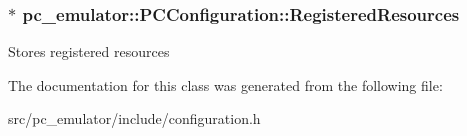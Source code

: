\subsubsection[{\texorpdfstring{Registered\+Resources}{RegisteredResources}}]{$\ast$ pc\+\_\+emulator\+::\+P\+C\+Configuration\+::\+Registered\+Resources}\hypertarget{classpc__emulator_1_1PCConfiguration_ac9d21e1ff21b9279867e73675c3b15e9}{}\label{classpc__emulator_1_1PCConfiguration_ac9d21e1ff21b9279867e73675c3b15e9}
Stores registered resources 

The documentation for this class was generated from the following file\+:\begin{DoxyCompactItemize}
\item 
src/pc\+\_\+emulator/include/configuration.\+h\end{DoxyCompactItemize}
